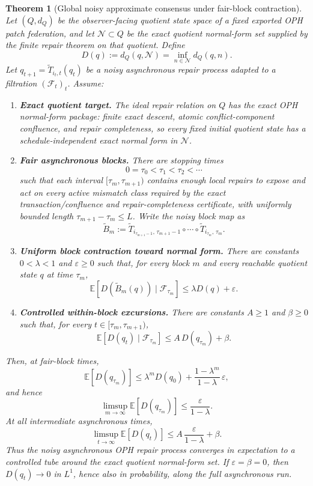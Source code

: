\documentclass[11pt]{article}
\newtheorem{theorem}{Theorem}[section]
\theoremstyle{remark}
\theoremstyle{plain}
\begin{document}
\begin{theorem}[Global noisy approximate consensus under fair-block contraction]
\label{thm:noisy-fair-block-consensus}
Let \((Q,d_Q)\) be the observer-facing quotient state space of a fixed exported OPH patch
federation, and let \(\mathcal N\subset Q\) be the exact quotient normal-form set supplied by the
finite repair theorem on that quotient. Define
\[
D(q):=d_Q(q,\mathcal N)=\inf_{n\in\mathcal N}d_Q(q,n).
\]
Let \(q_{t+1}=\widetilde T_{i_t,t}(q_t)\) be a noisy asynchronous repair process adapted to a
filtration \((\mathcal F_t)_t\). Assume:
\begin{enumerate}[(G1)]
\item \textbf{Exact quotient target.} The ideal repair relation on \(Q\) has the exact OPH
normal-form package: finite exact descent, atomic conflict-component confluence, and repair
completeness, so every fixed initial quotient state has a schedule-independent exact normal form
in \(\mathcal N\).
\item \textbf{Fair asynchronous blocks.} There are stopping times
\[
0=\tau_0<\tau_1<\tau_2<\cdots
\]
such that each interval \([\tau_m,\tau_{m+1})\) contains enough local repairs to expose and act on
every active mismatch class required by the exact transaction/confluence and repair-completeness
certificate, with uniformly bounded length \(\tau_{m+1}-\tau_m\le L\). Write the noisy block map
as
\[
\widetilde B_m
:=
\widetilde T_{i_{\tau_{m+1}-1},\,\tau_{m+1}-1}
\circ\cdots\circ
\widetilde T_{i_{\tau_m},\,\tau_m}.
\]
\item \textbf{Uniform block contraction toward normal form.} There are constants
\(0<\lambda<1\) and \(\varepsilon\ge0\) such that, for every block \(m\) and every reachable
quotient state \(q\) at time \(\tau_m\),
\[
\mathbb E\!\left[
D\!\left(\widetilde B_m(q)\right)
\mid \mathcal F_{\tau_m}
\right]
\le
\lambda D(q)+\varepsilon.
\]
\item \textbf{Controlled within-block excursions.} There are constants \(A\ge1\) and
\(\beta\ge0\) such that, for every \(t\in[\tau_m,\tau_{m+1})\),
\[
\mathbb E\!\left[
D(q_t)\mid \mathcal F_{\tau_m}
\right]
\le
A\,D(q_{\tau_m})+\beta.
\]
\end{enumerate}
Then, at fair-block times,
\[
\mathbb E[D(q_{\tau_m})]
\le
\lambda^mD(q_0)
+
\frac{1-\lambda^m}{1-\lambda}\,\varepsilon,
\]
and hence
\[
\limsup_{m\to\infty}\mathbb E[D(q_{\tau_m})]
\le
\frac{\varepsilon}{1-\lambda}.
\]
At all intermediate asynchronous times,
\[
\limsup_{t\to\infty}\mathbb E[D(q_t)]
\le
A\,\frac{\varepsilon}{1-\lambda}+\beta.
\]
Thus the noisy asynchronous OPH repair process converges in expectation to a controlled tube
around the exact quotient normal-form set. If \(\varepsilon=\beta=0\), then \(D(q_t)\to0\) in
\(L^1\), hence also in probability, along the full asynchronous run.
\end{theorem}
\end{document}

